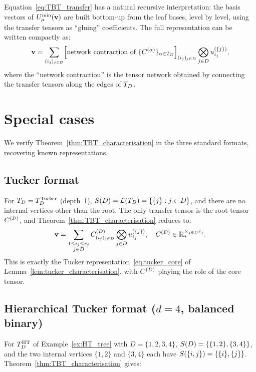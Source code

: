 Equation~\eqref{eq:TBT_transfer} has a natural recursive interpretation:
the basis vectors of $U^{\min}_{\mu}(\mathbf{v})$ are built bottom-up from the
leaf bases, level by level, using the transfer tensors as ``gluing''
coefficients. The full representation can be written compactly as:
\begin{equation}
\label{eq:TBT_full_recursive}
    \mathbf{v} = \sum_{(i_j)_{j \in D}}
    \Bigl[\text{network contraction of }
    \{C^{(\alpha)}\}_{\alpha \in T_D}\Bigr]_{(i_j)_{j\in D}}
    \bigotimes_{j \in D} u^{(\{j\})}_{i_j},
\end{equation}
where the ``network contraction'' is the tensor network obtained by
connecting the transfer tensors along the edges of $T_D$.

\section{Special cases}
\label{sec:algTBT:special}

We verify Theorem~\ref{thm:TBT_characterisation} in the three standard
formats, recovering known representations.

\subsection*{Tucker format}

For $T_D = T_D^{\mathrm{Tucker}}$ (depth~1), $S(D) = \mathcal{L}(T_D) = \{\{j\} : j \in D\}$,
and there are no internal vertices other than the root. The only
transfer tensor is the root tensor $C^{(D)}$, and
Theorem~\ref{thm:TBT_characterisation} reduces to:
\begin{equation*}
    \mathbf{v} = \sum_{\substack{1 \leq i_j \leq r_j \\ j \in D}}
    C^{(D)}_{(i_j)_{j \in D}}
    \bigotimes_{j \in D} u^{(\{j\})}_{i_j},
    \quad C^{(D)} \in \mathbb{R}^{\times_{j \in D} r_j}_*.
\end{equation*}
This is exactly the Tucker representation~\eqref{eq:tucker_core} of
Lemma~\ref{lem:tucker_characterisation}, with $C^{(D)}$ playing the role
of the core tensor.

\subsection*{Hierarchical Tucker format ($d=4$, balanced binary)}

For $T_D^{\mathrm{HT}}$ of Example~\ref{ex:HT_tree} with $D=\{1,2,3,4\}$,
$S(D) = \{\{1,2\},\{3,4\}\}$, and the two internal vertices
$\{1,2\}$ and $\{3,4\}$ each have $S(\{i,j\}) = \{\{i\},\{j\}\}$.
Theorem~\ref{thm:TBT_characterisation} gives:

